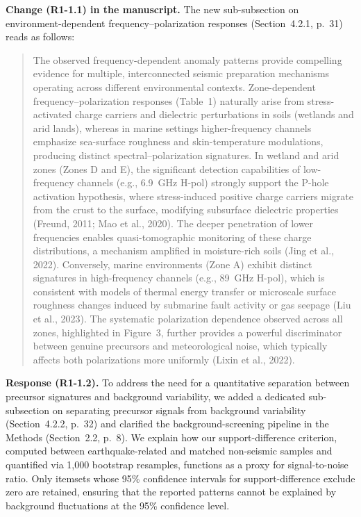 \documentclass[12pt]{article}
\newcommand{\revresponse}[1]{\begingroup\color{responsecolor}#1\endgroup}
\newcommand{\revchange}[1]{\begingroup\color{changecolor}#1\endgroup}
\begin{document}
\revchange{%
\textbf{Change (R1-1.1) in the manuscript.}
The new sub-subsection on environment-dependent frequency--polarization responses (Section~4.2.1, p.~31) reads as follows:

\begin{quote}
The observed frequency-dependent anomaly patterns provide compelling evidence for multiple, interconnected seismic preparation mechanisms operating across different environmental contexts. Zone-dependent frequency--polarization responses (Table~1) naturally arise from stress-activated charge carriers and dielectric perturbations in soils (wetlands and arid lands), whereas in marine settings higher-frequency channels emphasize sea-surface roughness and skin-temperature modulations, producing distinct spectral--polarization signatures. In wetland and arid zones (Zones D and E), the significant detection capabilities of low-frequency channels (e.g., 6.9~GHz H-pol) strongly support the P-hole activation hypothesis, where stress-induced positive charge carriers migrate from the crust to the surface, modifying subsurface dielectric properties (Freund, 2011; Mao et al., 2020). The deeper penetration of lower frequencies enables quasi-tomographic monitoring of these charge distributions, a mechanism amplified in moisture-rich soils (Jing et al., 2022). Conversely, marine environments (Zone A) exhibit distinct signatures in high-frequency channels (e.g., 89~GHz H-pol), which is consistent with models of thermal energy transfer or microscale surface roughness changes induced by submarine fault activity or gas seepage (Liu et al., 2023). The systematic polarization dependence observed across all zones, highlighted in Figure~3, further provides a powerful discriminator between genuine precursors and meteorological noise, which typically affects both polarizations more uniformly (Lixin et al., 2022).
\end{quote}
}

\revresponse{%
\textbf{Response (R1-1.2).} To address the need for a quantitative separation between precursor signatures and background variability, we added a dedicated sub-subsection on separating precursor signals from background variability (Section~4.2.2, p.~32) and clarified the background-screening pipeline in the Methods (Section~2.2, p.~8). We explain how our support-difference criterion, computed between earthquake-related and matched non-seismic samples and quantified via 1,000 bootstrap resamples, functions as a proxy for signal-to-noise ratio. Only itemsets whose 95\% confidence intervals for support-difference exclude zero are retained, ensuring that the reported patterns cannot be explained by background fluctuations at the 95\% confidence level.
}
\end{document}
